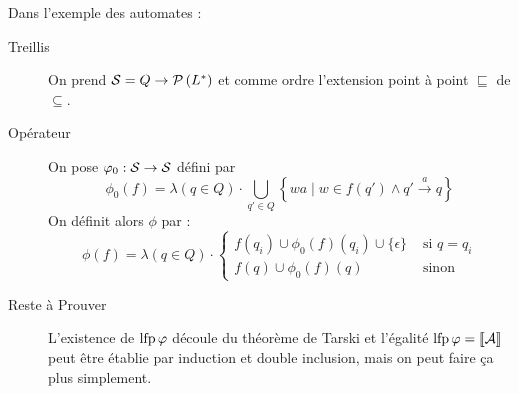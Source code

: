 \documentclass{cours}
\begin{document}
Dans l'exemple des automates : 
\begin{description}
    \item[Treillis] On prend $\mathcal{S} = Q \to \mathcal{P}\left(L^{*}\right)$ et comme ordre l'extension point à point $\sqsubseteq$ de $\subseteq$.
    \item[Opérateur] On pose $\varphi_{0}: \mathcal{S} \to \mathcal{S}$ défini par 
    \[
        \phi_{0}(f) = \lambda(q \in Q) \cdot \bigcup_{q' \in Q}\left\{wa \mid w \in f(q') \land q' \xrightarrow{a} q\right\}
    \] 
    On définit alors $\phi$ par : 
    \[
        \phi(f) = \lambda(q \in Q) \cdot \begin{cases}
            f(q_{i}) \cup \phi_{0}(f)(q_{i}) \cup \{\epsilon\} & \text{ si } q = q_{i}\\
            f(q) \cup \phi_{0}(f)(q) & \text{ sinon}
        \end{cases}
    \]
    \item[Reste à Prouver] L'existence de $\operatorname{lfp}\varphi$ découle du théorème de Tarski et l'égalité $\operatorname{lfp} \varphi = \left\llbracket \mathcal{A} \right\rrbracket$ peut être établie par induction et double inclusion, mais on peut faire ça plus simplement.
\end{description}
\end{document}

